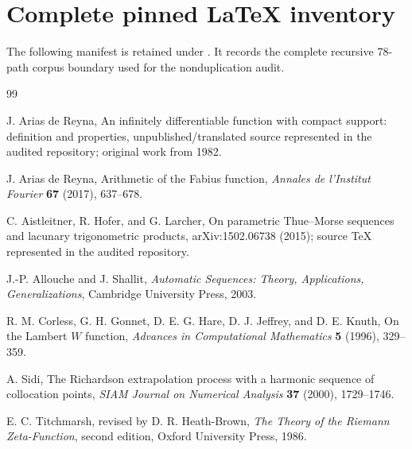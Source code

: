 \documentclass[11pt]{article}
\numberwithin{equation}{section}
\theoremstyle{definition}
\theoremstyle{remark}
\begin{document}
\section{Complete pinned LaTeX inventory}
\label{p6:app:inventory}

The following manifest is retained under
.  It records the complete
recursive 78-path corpus boundary used for the nonduplication audit.



\begin{thebibliography}{99}

J. Arias de Reyna,
\newblock An infinitely differentiable function with compact support: definition and properties,
\newblock unpublished/translated source represented in the audited repository; original work from 1982.

J. Arias de Reyna,
\newblock Arithmetic of the Fabius function,
\newblock \emph{Annales de l'Institut Fourier} \textbf{67} (2017), 637--678.

C. Aistleitner, R. Hofer, and G. Larcher,
\newblock On parametric Thue--Morse sequences and lacunary trigonometric products,
\newblock arXiv:1502.06738 (2015); source TeX represented in the audited repository.

J.-P. Allouche and J. Shallit,
\newblock \emph{Automatic Sequences: Theory, Applications, Generalizations},
\newblock Cambridge University Press, 2003.

R. M. Corless, G. H. Gonnet, D. E. G. Hare, D. J. Jeffrey, and D. E. Knuth,
\newblock On the Lambert $W$ function,
\newblock \emph{Advances in Computational Mathematics} \textbf{5} (1996), 329--359.

A. Sidi,
\newblock The Richardson extrapolation process with a harmonic sequence of collocation points,
\newblock \emph{SIAM Journal on Numerical Analysis} \textbf{37} (2000), 1729--1746.

E. C. Titchmarsh, revised by D. R. Heath-Brown,
\newblock \emph{The Theory of the Riemann Zeta-Function}, second edition,
\newblock Oxford University Press, 1986.


\end{thebibliography}
\end{document}

